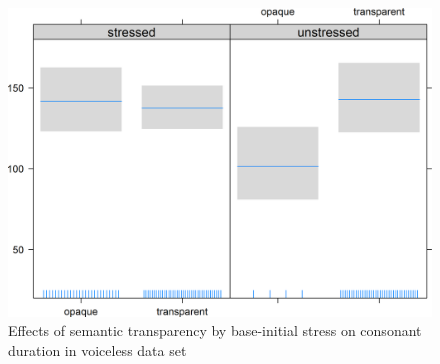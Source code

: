 \begin{figure}
	

	\includegraphics [scale=0.5]{images/Corpus/disModelWithoutVoicedSoundsSemanticTransTypeByStress.png}
	\caption{Effects of semantic transparency by  base-initial stress on consonant duration in voiceless data set}
	\label{fig:corpus main effect 2 dis without voiced items}
\end{figure}






